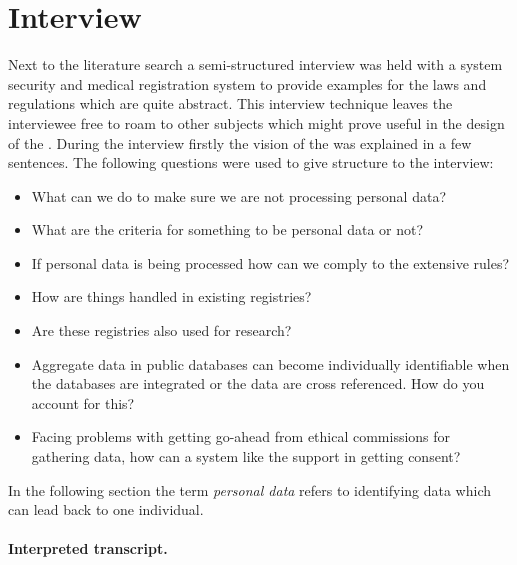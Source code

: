 \section{Interview}
\label{security-interviews}




Next to the literature search a semi-structured interview was held with a system security and medical registration system  to provide examples for the laws and regulations which are quite abstract.
This interview technique leaves the interviewee free to roam to other subjects which might prove useful in the design of the \ivfsystem{}.
During the interview firstly the vision of the \ivfsystem{} was explained in a few sentences.
The following questions were used to give structure to the interview:

\begin{itemize}
  \item What can we do to make sure we are not processing personal data?
  \item What are the criteria for something to be personal data or not?
  \item If personal data is being processed how can we comply to the extensive rules?
  \item How are things handled in existing registries?
  \item Are these registries also used for research?
  \item Aggregate data in public databases can become individually identifiable when the databases are integrated or the data are cross referenced. 
  How do you account for this?
  \item Facing problems with getting go-ahead from ethical commissions for gathering data, how can a system like the \ivfsystem{} support in getting consent?
\end{itemize}

In the following section the term \emph{personal data} refers to identifying data which can lead back to one individual.


\paragraph{Interpreted transcript.}
\label{security-interview-transcript}


